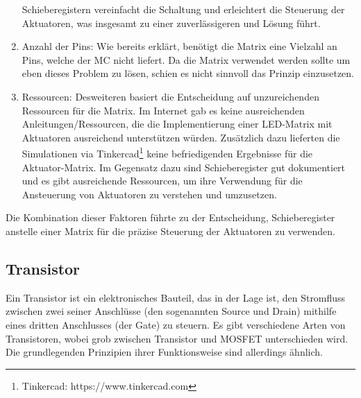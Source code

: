 \begin{enumerate}
	Schieberegistern vereinfacht die Schaltung und erleichtert die Steuerung der Aktuatoren, was insgesamt zu einer
	zuverlässigeren und Lösung führt. %
	\item Anzahl der Pins: Wie bereits erklärt, benötigt die Matrix eine Vielzahl an Pins, welche der \ac{MC} %
	nicht liefert. Da die Matrix verwendet werden sollte um eben dieses Problem zu lösen, schien es nicht sinnvoll
	das Prinzip einzusetzen. %
	\item Ressourcen: Desweiteren basiert die Entscheidung auf unzureichenden Ressourcen für die Matrix. Im Internet gab es
	keine ausreichenden Anleitungen/Ressourcen, die die Implementierung einer LED-Matrix mit Aktuatoren ausreichend
	unterstützen würden. Zusätzlich dazu lieferten die Simulationen via Tinkercad\footnote{Tinkercad: https://www.tinkercad.com} keine befriedigenden Ergebnisse
	für die Aktuator-Matrix.
	Im Gegensatz dazu sind Schieberegister gut dokumentiert und es gibt ausreichende Ressourcen, um ihre
	Verwendung für die Ansteuerung von Aktuatoren zu verstehen und umzusetzen.
\end{enumerate}

Die Kombination dieser Faktoren führte zu der Entscheidung, Schieberegister anstelle einer Matrix für die präzise Steuerung der Aktuatoren zu verwenden. %



\subsection{Transistor}
Ein Transistor ist ein elektronisches Bauteil, das in der Lage ist, den Stromfluss zwischen zwei seiner Anschlüsse
(den sogenannten Source und Drain) mithilfe eines dritten Anschlusses (der Gate) zu steuern. Es gibt verschiedene Arten
von Transistoren, wobei grob zwischen Transistor und MOSFET unterschieden wird.
Die grundlegenden Prinzipien ihrer Funktionsweise sind allerdings ähnlich.

